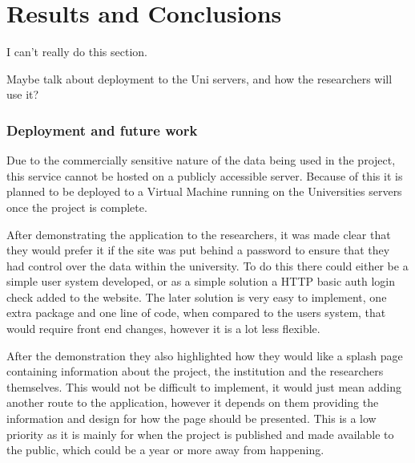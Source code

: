\chapter{Results and Conclusions}
I can't really do this section.

Maybe talk about deployment to the Uni servers, and how the researchers will use it? 

\subsection{Deployment and future work}
Due to the commercially sensitive nature of the data being used in the project, this service cannot be hosted on a publicly accessible server. Because of this it is planned to be deployed to a Virtual Machine running on the Universities servers once the project is complete. 

After demonstrating the application to the researchers, it was made clear that they would prefer it if the site was put behind a password to ensure that they had control over the data within the university. To do this there could either be a simple user system developed, or as a simple solution a HTTP basic auth login check added to the website. The later solution is very easy to implement, one extra package and one line of code, when compared to the users system, that would require front end changes, however it is a lot less flexible. 

After the demonstration they also highlighted how they would like a splash page containing information about the project, the institution and the researchers themselves. This would not be difficult to implement, it would just mean adding another route to the application, however it depends on them providing the information and design for how the page should be presented. This is a low priority as it is mainly for when the project is published and made available to the public, which could be a year or more away from happening. 




